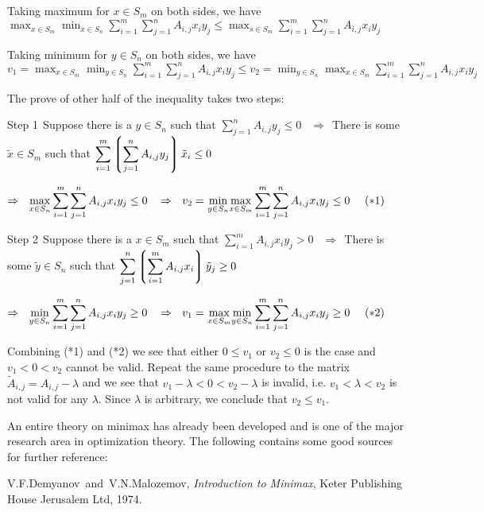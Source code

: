 \documentclass[12pt]{article}
\begin{document}
Taking maximum for $x\in S_m$ on both sides, we have $\displaystyle{\max_{x\in S_m}\min_{x\in S_n}\sum_{i=1}^m\sum_{j=1}^nA_{i,j}x_iy_j\leq \max_{s\in S_m}\sum_{i=1}^m\sum_{j=1}^nA_{i,j}x_iy_j}$

Taking minimum for $y\in S_n$ on both sides, we have $\displaystyle{v_1=\max_{x\in S_m}\min_{y\in S_n}\sum_{i=1}^m\sum_{j=1}^nA_{i,j}x_iy_j\leq v_2=\min_{y\in S_n}\max_{x\in S_m}\sum_{i=1}^m\sum_{j=1}^nA_{i,j}x_iy_j }$

The prove of other half of the inequality takes two steps:

{\rm Step 1}$~~$Suppose there is a $y\in S_n$ such that $\displaystyle{\sum_{j=1}^nA_{i,j}y_j\leq 0}$
$~~\Rightarrow~~$There is some ${\tilde x}\in S_m$ such that $\displaystyle{\sum_{i=1}^m\left\lgroup \sum_{j=1}^nA_{i,j}y_j\right\rgroup {\tilde x}_i\leq 0 }$

$\Rightarrow~~\displaystyle{\underset{x\in S_n}{\rm max}\sum_{i=1}^m\sum_{j=1}^nA_{i,j}x_iy_j\leq 0}$
$~~\Rightarrow~~\displaystyle{v_2=\underset{y\in S_n}{\rm min}\underset{x\in S_m}{\rm max}
\sum_{i=1}^m\sum_{j=1}^nA_{i,j}x_iy_j\leq 0 }~~~~(*1)$

{\rm Step 2}$~~$Suppose there is a $x\in S_m$ such that $\displaystyle{\sum_{i=1}^mA_{i,j}x_iy_j>0}$
$~~\Rightarrow~~$There is some ${\tilde y}\in S_n$ such that $\displaystyle{\sum_{j=1}^n\left\lgroup \sum_{i=1}^mA_{i,j}x_i\right\rgroup {\tilde y}_j\geq 0 }$

$\Rightarrow~~\displaystyle{\underset{y\in S_n}{\rm min}\sum_{i=1}^m\sum_{j=1}^nA_{i,j}x_iy_j\geq 0 }$
$~~\Rightarrow~~\displaystyle{v_1=\underset{x\in S_m}{\rm max}\underset{y\in S_n}{\rm min}
\sum_{i=1}^m\sum_{j=1}^nA_{i,j}x_iy_j \geq 0}~~~~(*2)$

Combining (*1) and (*2) we see that either $0\leq v_1$ or $v_2\leq 0$ is the case and $v_1<0<v_2$ cannot be valid. Repeat the same procedure to the matrix ${\tilde A}_{i,j}=A_{i,j}-\lambda$ and we see that $v_1-\lambda <0<v_2-\lambda$ is invalid, i.e. $v_1<\lambda <v_2$ is not valid for any $\lambda$. Since $\lambda$ is arbitrary, we conclude that $v_2\leq v_1$. 


\smallskip

An entire theory on minimax has already been developed and is one of the major research area in optimization theory. The following contains some good sources for further reference:

\begin{thebibliography}{9}
 V.F.Demyanov~and~V.N.Malozemov, \emph{Introduction to Minimax}, Keter Publishing House Jerusalem Ltd, 1974.
\end{thebibliography}

\end{document}
